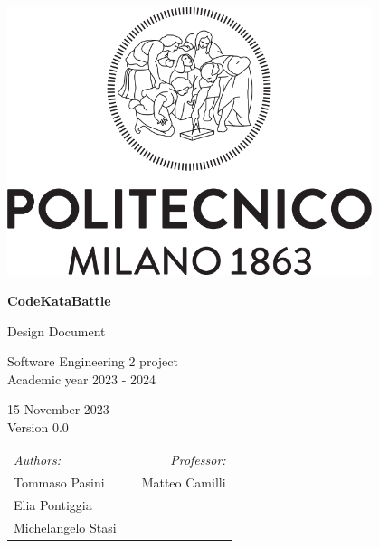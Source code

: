 
\begin{titlepage}
    \begin{center}
        \includegraphics[width=0.8\textwidth]{images/PoliMi_Logo.png}

        \vspace*{2cm}
        \textbf{\huge CodeKataBattle}

        \vspace{0.5cm}
        \LARGE Design Document

        \vspace{1.5cm}
        \normalsize Software Engineering 2 project\\
        Academic year 2023 - 2024

        \vspace{0.5cm}
        15 November 2023\\
        Version 0.0

        \vspace{1cm}
        \small
        \begin{table}[b]
            \centering
            \begin{tabular}{l p{5.5cm} l}
                \textit{Authors:}   &  & \multicolumn{1}{r}{\textit{Professor:}} \\
                Tommaso Pasini      &  & \multicolumn{1}{r}{Matteo Camilli}      \\
                Elia Pontiggia      &  & \textbf{}                               \\
                Michelangelo Stasi  &  & \textbf{}
            \end{tabular}
        \end{table}

    \end{center}
\end{titlepage}
